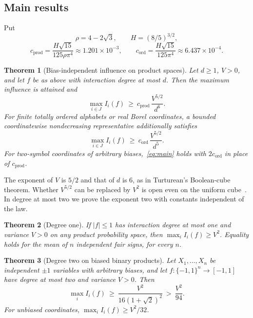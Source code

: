 \documentclass[11pt]{article}
\numberwithin{equation}{section}
\newcommand{\Cgen}{c_{\mathrm{prod}}}
\newcommand{\Cmon}{c_{\mathrm{ord}}}
\theoremstyle{plain}
\newtheorem{theorem}{Theorem}
\theoremstyle{remark}
\begin{document}
\subsection{Main results}\label{sec:main}
Put
\[
\rho=4-2\sqrt3,\qquad H=(8/5)^{3/2},
\]
\[
\Cgen=\frac{H\sqrt{15}}{125\rho\pi^4}\approx1.201\times10^{-3},\qquad
\Cmon=\frac{H\sqrt{15}}{125\pi^4}\approx6.437\times10^{-4}.
\]

\begin{theorem}[Bias-independent influence on product spaces]\label{thm:main}
Let $d\ge1$, $V>0$, and let $f$ be as above with interaction degree at most $d$. Then the maximum influence is attained and
\begin{equation}\label{eq:main}
\max_{i\in J}I_i(f)\ \ge\ \Cgen\,\frac{V^{5/2}}{d^6}.
\end{equation}
For finite totally ordered alphabets or real Borel coordinates, a bounded coordinatewise nondecreasing representative additionally satisfies
\begin{equation}\label{eq:mono}
\max_{i\in J}I_i(f)\ \ge\ \Cmon\,\frac{V^{5/2}}{d^5}.
\end{equation}
For two-symbol coordinates of arbitrary biases,~\eqref{eq:main} holds with $2\Cmon$ in place of $\Cgen$.
\end{theorem}

The exponent of $V$ is $5/2$ and that of $d$ is $6$, as in Turturean's Boolean-cube theorem. Whether $V^{5/2}$ can be replaced by $V^2$ is open even on the uniform cube~\cite[Section~9.5]{Tur26}. In degree at most two we prove the exponent two with constants independent of the law.

\begin{theorem}[Degree one]\label{thm:degone}
If $|f|\le1$ has interaction degree at most one and variance $V>0$ on any product probability space, then $\max_iI_i(f)\ge V^2$. Equality holds for the mean of $n$ independent fair signs, for every $n$.
\end{theorem}

\begin{theorem}[Degree two on biased binary products]\label{thm:degtwo}
Let $X_1,\dots,X_n$ be independent $\pm1$ variables with arbitrary biases, and let $f:\{-1,1\}^n\to[-1,1]$ have degree at most two and variance $V>0$. Then
\begin{equation}\label{eq:degtwo}
\max_iI_i(f)\ \ge\ \frac{V^2}{16(1+\sqrt2)^2}\ >\ \frac{V^2}{94}.
\end{equation}
For unbiased coordinates, $\max_iI_i(f)\ge V^2/32$.
\end{theorem}
\end{document}
